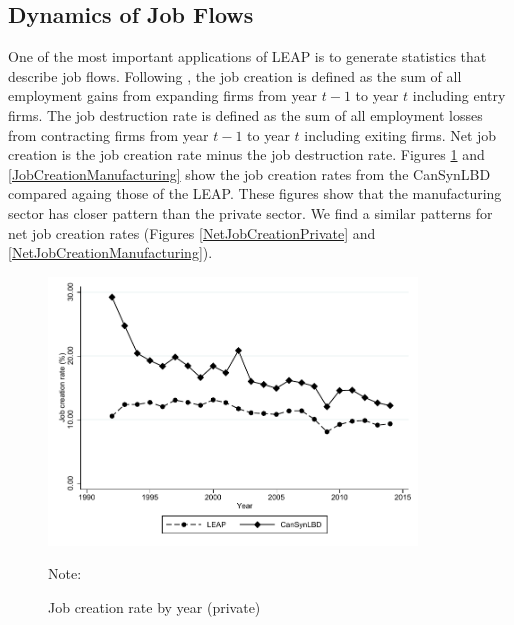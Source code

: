\subsection{Dynamics of Job Flows}

One of the most important applications of LEAP is to generate statistics that describe job flows. Following \cite{DavisHaltiwangerSchuh}, the job creation is defined as the sum of all employment gains from expanding firms from year $t-1$ to year $t$ including entry firms. The job destruction rate is defined as the sum of all employment losses from contracting firms from year $t-1$ to year $t$ including exiting firms. Net job creation is the job creation rate minus the job destruction rate. Figures \ref{JobCreationPrivate} and \ref{JobCreationManufacturing} show the job creation rates from the CanSynLBD compared againg those of the LEAP. These figures show that the manufacturing sector has closer pattern than the private sector. We find a similar patterns for net job creation rates (Figures \ref{NetJobCreationPrivate} and  \ref{NetJobCreationManufacturing}).

\begin{figure} [H]
\centering
\caption{Job creation rate by year (private)} \label{JobCreationPrivate}
\includegraphics[height=2.8in, width=.7\linewidth]{graphs/Job_creation_rate_by_year_private_bw.pdf} 
\begin{minipage}{0.85\textwidth}
{\footnotesize Note: \CanTableNote \par}
\end{minipage}
\end{figure}

